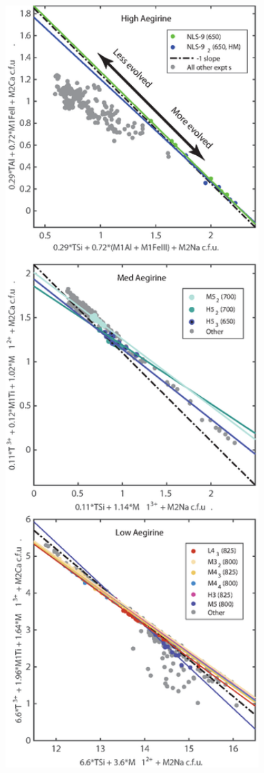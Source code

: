 \documentclass[final,authoryear,3p,times,twocolumn]{elsarticle}
\begin{document}
        \begin{figure}[htpb]
\begin{center}
  \begin{minipage}[c]{.47\linewidth}
  \null
\includegraphics[width=1\textwidth]{S3_ExchMech_Feb2017-02.eps}

\end{minipage}
\end{center}
\end{figure}
\end{document}
